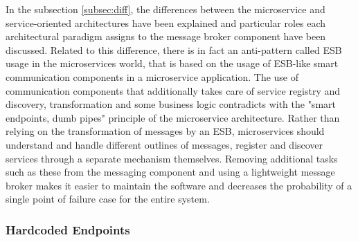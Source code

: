 \documentclass{Configuration_Files/PoliMi3i_thesis}
\begin{document}
In the subsection \ref{subsec:diff}, the differences between the microservice and service-oriented architectures have been explained and particular roles each architectural paradigm assigns to the message broker component have been discussed.
Related to this difference, there is in fact an anti-pattern called ESB usage in the microservices world, that is based on the usage of ESB-like smart communication components in a microservice application.
The use of communication components that additionally takes care of service registry and discovery, transformation and some business logic contradicts with the "smart endpoints, dumb pipes" principle of the microservice architecture.
Rather than relying on the transformation of messages by an ESB, microservices should understand and handle different outlines of messages, register and discover services through a separate mechanism themselves.
Removing additional tasks such as these from the messaging component and using a lightweight message broker makes it easier to maintain the software and decreases the probability of a single point of failure case for the entire system.

\subsubsection{Hardcoded Endpoints}
\label{subsubsec:hardcoded_endpoints}
\end{document}

